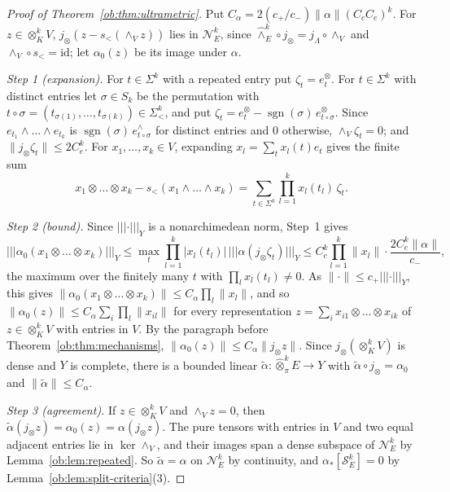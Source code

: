 \documentclass[11pt]{amsart}
\theoremstyle{definition}
\theoremstyle{remark}
\numberwithin{equation}{section}
\newcommand{\sgn}{\operatorname{sgn}}
\newcommand{\id}{\mathrm{id}}
\newcommand{\abs}[1]{\lvert #1\rvert}
\newcommand{\norm}[1]{\lVert #1\rVert}
\theoremstyle{plain}
\theoremstyle{definition}
\theoremstyle{plain}
\newcommand{\cN}{\mathcal N}
\newcommand{\cS}{\mathcal S}
\begin{document}
\begin{proof}[Proof of Theorem~\ref{ob:thm:ultrametric}]
Put $C_\alpha=2(c_+/c_-)\norm\alpha(C_cC_e)^k$. For
$z\in\otimes^k_KV$, $j_\otimes(z-s_<(\wedge_Vz))$ lies in $\cN^k_E$, since $\widehat\wedge^k_E\circ j_\otimes=j_\Lambda\circ\wedge_V$
and $\wedge_V\circ s_<=\id$; let $\alpha_0(z)$ be its image under $\alpha$.

\emph{Step 1 (expansion).} For $t\in\Sigma^k$ with a repeated entry put $\zeta_t=e^\otimes_t$. For $t\in\Sigma^k$ with
distinct entries let $\sigma\in S_k$ be the permutation with $t\circ\sigma=(t_{\sigma(1)},\dots,t_{\sigma(k)})\in\Sigma^k_<$,
and put $\zeta_t=e^\otimes_t-\sgn(\sigma)\,e^\otimes_{t\circ\sigma}$. Since $e_{t_1}\wedge\dots\wedge e_{t_k}$ is
$\sgn(\sigma)\,e^\wedge_{t\circ\sigma}$ for distinct entries and $0$ otherwise, $\wedge_V\zeta_t=0$; and
$\norm{j_\otimes\zeta_t}\le2C_e^k$. For $x_1,\dots,x_k\in V$, expanding $x_l=\sum_tx_l(t)e_t$ gives the finite sum
\[
 x_1\otimes\dots\otimes x_k-s_<(x_1\wedge\dots\wedge x_k)=\sum_{t\in\Sigma^k}\prod_{l=1}^kx_l(t_l)\,\zeta_t.
\]

\emph{Step 2 (bound).} Since $\lvert\!\lvert\!\lvert\cdot\rvert\!\rvert\!\rvert_Y$ is a nonarchimedean norm, Step~1 gives
\[
 \lvert\!\lvert\!\lvert\alpha_0(x_1\otimes\dots\otimes x_k)\rvert\!\rvert\!\rvert_Y\le\max_t\prod_{l=1}^k\abs{x_l(t_l)}\,\lvert\!\lvert\!\lvert\alpha(j_\otimes\zeta_t)\rvert\!\rvert\!\rvert_Y
 \le C_c^k\prod_{l=1}^k\norm{x_l}\cdot\frac{2C_e^k\norm\alpha}{c_-},
\]
the maximum over the finitely many $t$ with $\prod_lx_l(t_l)\ne0$. As $\norm\cdot\le c_+\lvert\!\lvert\!\lvert\cdot\rvert\!\rvert\!\rvert_Y$, this gives
$\norm{\alpha_0(x_1\otimes\dots\otimes x_k)}\le C_\alpha\prod_l\norm{x_l}$, and so
$\norm{\alpha_0(z)}\le C_\alpha\sum_i\prod_l\norm{x_{il}}$ for every representation $z=\sum_ix_{i1}\otimes\dots\otimes x_{ik}$ of
$z\in\otimes^k_KV$ with entries in $V$. By the paragraph before Theorem~\ref{ob:thm:mechanisms},
$\norm{\alpha_0(z)}\le C_\alpha\norm{j_\otimes z}$. Since $j_\otimes(\otimes^k_KV)$ is dense and $Y$ is complete, there is a
bounded linear $\tilde\alpha\colon\widehat\otimes^k_\pi E\to Y$ with $\tilde\alpha\circ j_\otimes=\alpha_0$ and
$\norm{\tilde\alpha}\le C_\alpha$.

\emph{Step 3 (agreement).} If $z\in\otimes^k_KV$ and $\wedge_Vz=0$, then $\tilde\alpha(j_\otimes z)=\alpha_0(z)=\alpha(j_\otimes z)$.
The pure tensors with entries in $V$ and two equal adjacent entries lie in $\ker\wedge_V$, and their images span a dense
subspace of $\cN^k_E$ by Lemma~\ref{ob:lem:repeated}. So $\tilde\alpha=\alpha$ on $\cN^k_E$ by continuity, and
$\alpha_*[\cS^k_E]=0$ by Lemma~\ref{ob:lem:split-criteria}(3).


\end{proof}
\end{document}
